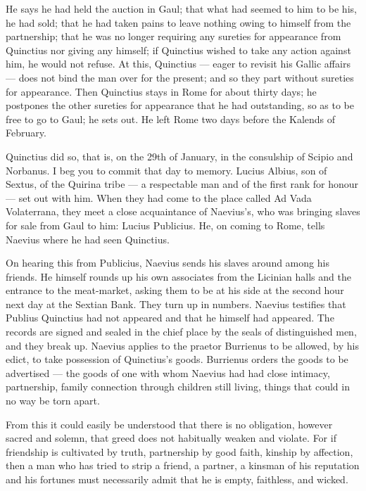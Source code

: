  He says he had held the auction in Gaul; that what had seemed to him to be his, he had sold; that he had taken pains to leave nothing owing to himself from the partnership; that he was no longer requiring any sureties for appearance from Quinctius nor giving any himself; if Quinctius wished to take any action against him, he would not refuse. At this, Quinctius — eager to revisit his Gallic affairs — does not bind the man over for the present; and so they part without sureties for appearance. Then Quinctius stays in Rome for about thirty days; he postpones the other sureties for appearance that he had outstanding, so as to be free to go to Gaul; he sets out. He left Rome two days before the Kalends of February.

 Quinctius did so, that is, on the 29th of January, in the consulship of Scipio and Norbanus. I beg you to commit that day to memory. Lucius Albius, son of Sextus, of the Quirina tribe — a respectable man and of the first rank for honour — set out with him. When they had come to the place called Ad Vada Volaterrana, they meet a close acquaintance of Naevius's, who was bringing slaves for sale from Gaul to him: Lucius Publicius. He, on coming to Rome, tells Naevius where he had seen Quinctius.

 On hearing this from Publicius, Naevius sends his slaves around among his friends. He himself rounds up his own associates from the Licinian halls and the entrance to the meat-market, asking them to be at his side at the second hour next day at the Sextian Bank. They turn up in numbers. Naevius testifies that Publius Quinctius had not appeared and that he himself had appeared. The records are signed and sealed in the chief place by the seals of distinguished men, and they break up. Naevius applies to the praetor Burrienus to be allowed, by his edict, to take possession of Quinctius's goods. Burrienus orders the goods to be advertised --- the goods of one with whom Naevius had had close intimacy, partnership, family connection through children still living, things that could in no way be torn apart.

 From this it could easily be understood that there is no obligation, however sacred and solemn, that greed does not habitually weaken and violate. For if friendship is cultivated by truth, partnership by good faith, kinship by affection, then a man who has tried to strip a friend, a partner, a kinsman of his reputation and his fortunes must necessarily admit that he is empty, faithless, and wicked.

